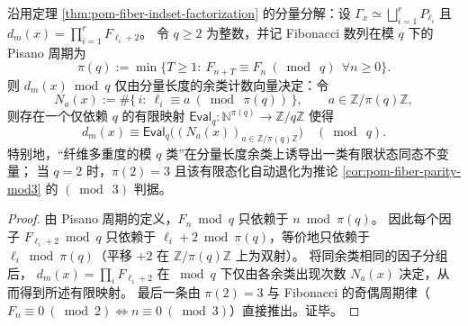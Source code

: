 \begin{corollary}\label{cor:pom-fiber-modq-pisano-invariant}
沿用定理 \ref{thm:pom-fiber-indset-factorization} 的分量分解：设
\(
\Gamma_x\simeq\bigsqcup_{i=1}^r P_{\ell_i}
\)
且
\(
d_m(x)=\prod_{i=1}^r F_{\ell_i+2}
\)。
令 \(q\ge 2\) 为整数，并记 Fibonacci 数列在模 \(q\) 下的 Pisano 周期为
\[
\pi(q):=\min\{T\ge 1:\ F_{n+T}\equiv F_n\ (\bmod\ q)\ \ \forall n\ge 0\}.
\]
则 \(d_m(x)\bmod q\) 仅由分量长度的余类计数向量决定：令
\[
N_a(x):=\#\{\,i:\ \ell_i\equiv a\ (\bmod\ \pi(q))\,\},
\qquad a\in \mathbb{Z}/\pi(q)\mathbb{Z},
\]
则存在一个仅依赖 \(q\) 的有限映射
\(
\mathsf{Eval}_q:\mathbb{N}^{\pi(q)}\to \mathbb{Z}/q\mathbb{Z}
\)
使得
\[
\boxed{\;
d_m(x)\equiv \mathsf{Eval}_q\bigl((N_a(x))_{a\in\mathbb{Z}/\pi(q)\mathbb{Z}}\bigr)\quad(\bmod\ q).\;}
\]
特别地，“纤维多重度的模 \(q\) 类”在分量长度余类上诱导出一类有限状态同态不变量；
当 \(q=2\) 时，\(\pi(2)=3\) 且该有限态化自动退化为推论 \ref{cor:pom-fiber-parity-mod3} 的 \((\bmod\ 3)\) 判据。
\end{corollary}
\begin{proof}
由 Pisano 周期的定义，\(F_n\bmod q\) 只依赖于 \(n\bmod \pi(q)\)。
因此每个因子 \(F_{\ell_i+2}\bmod q\) 只依赖于 \(\ell_i+2\bmod \pi(q)\)，等价地只依赖于 \(\ell_i\bmod \pi(q)\)（平移 \(+2\) 在 \(\mathbb{Z}/\pi(q)\mathbb{Z}\) 上为双射）。
将同余类相同的因子分组后，
\(
d_m(x)=\prod_i F_{\ell_i+2}
\)
在 \(\bmod q\) 下仅由各余类出现次数 \(N_a(x)\) 决定，从而得到所述有限映射。
最后一条由 \(\pi(2)=3\) 与 Fibonacci 的奇偶周期律（\(F_n\equiv 0\ (\bmod 2)\iff n\equiv 0\ (\bmod 3)\)）直接推出。证毕。
\end{proof}

\endinput
